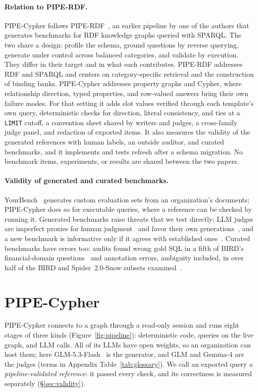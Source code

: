 \documentclass[11pt]{article}
\newcommand{\cy}[1]{\texttt{\small #1}}
\begin{document}
\paragraph{Relation to PIPE-RDF.} PIPE-Cypher follows PIPE-RDF~\citep{ranganath2026piperd}, an earlier pipeline by one of the authors that generates benchmarks for RDF knowledge graphs queried with SPARQL. The two share a design: profile the schema, ground questions by reverse querying, generate under control across balanced categories, and validate by execution. They differ in their target and in what each contributes. PIPE-RDF addresses RDF and SPARQL and centers on category-specific retrieval and the construction of binding banks. PIPE-Cypher addresses property graphs and Cypher, where relationship direction, typed properties, and row-valued answers bring their own failure modes. For that setting it adds slot values verified through each template's own query, deterministic checks for direction, literal consistency, and ties at a \cy{LIMIT} cutoff, a convention sheet shared by writers and judges, a cross-family judge panel, and redaction of exported items. It also measures the validity of the generated references with human labels, an outside auditor, and curated benchmarks, and it implements and tests refresh after a schema migration. No benchmark items, experiments, or results are shared between the two papers.

\paragraph{Validity of generated and curated benchmarks.} YourBench~\citep{yourbench2025} generates custom evaluation sets from an organization's documents; PIPE-Cypher does so for executable queries, where a reference can be checked by running it. Generated benchmarks raise threats that we test directly: LLM judges are imperfect proxies for human judgment~\citep{zheng2023judging} and favor their own generations~\citep{panickssery2024selfpref}, and a new benchmark is informative only if it agrees with established ones~\citep{perlitz2024agreement}. Curated benchmarks have errors too: audits found wrong gold SQL in a fifth of BIRD's financial-domain questions~\citep{wretblad2024noise} and annotation errors, ambiguity included, in over half of the BIRD and Spider~2.0-Snow subsets examined~\citep{jin2026pervasive}.

\section{PIPE-Cypher}
\label{sec:method}
PIPE-Cypher connects to a graph through a read-only session and runs eight stages of three kinds (Figure~\ref{fig:pipeline}): deterministic code, queries on the live graph, and LLM calls. All of its LLMs have open weights, so an organization can host them; here GLM-5.3-Flash~\citep{glm53flash2026hf} is the generator, and GLM and Gemma-4 are the judges (terms in Appendix Table~\ref{tab:glossary}). We call an exported query a \emph{pipeline-validated reference}: it passed every check, and its correctness is measured separately (\S\ref{sec:validity}).
\end{document}
